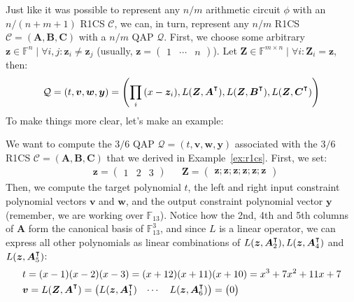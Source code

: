 \noindent Just like it was possible to represent any \(n/m\) arithmetic circuit \(\phi \) with an
\(n/(n+m+1)\) R1CS \(\mathcal{C}\), we can, in turn, represent any \(n/m\) R1CS
\(\mathcal{C} = (\bm{A}, \bm{B}, \bm{C})\) with a \(n/m\) QAP \(\mathcal{Q}\).
First, we choose some arbitrary
\(\bm{z} \in \mathbb{F}^n \mid \forall i,j\colon \bm{z}_i \neq \bm{z}_j\)
(usually, \(\bm{z} = \begin{pmatrix}1 & \cdots & n\end{pmatrix}\)).
Let \(\bm{Z} \in \mathbb{F}^{m \times n} \mid \forall i\colon \bm{Z}_i = \bm{z}\), then:
\[\mathcal{Q} = (t, \bm{v}, \bm{w}, \bm{y}) = \left(
	\prod_{i}{(x - \bm{z}_i)},
	L(\bm{Z}, \bm{A}^\transpose),
	L(\bm{Z}, \bm{B}^\transpose),
	L(\bm{Z}, \bm{C}^\transpose)
	\right)
\]
To make things more clear, let's make an example:
\begin{example}
	We want to compute the \(3/6\) QAP \(\mathcal{Q} = (t, \bm{v}, \bm{w}, \bm{y})\) associated with
	the \(3/6\) R1CS \(\mathcal{C} = (\bm{A}, \bm{B}, \bm{C})\) that we derived in
	Example~\ref{ex:r1cs}.
	First, we set:
	\begin{align*}
		 & \bm{z} = \begin{pmatrix}1 & 2 & 3\end{pmatrix} &  &
		\bm{Z} = \begin{pmatrix}\bm{z}; \bm{z}; \bm{z}; \bm{z}; \bm{z}; \bm{z}\end{pmatrix}
	\end{align*}
	Then, we compute the target polynomial \(t\), the left and right input constraint polynomial
	vectors \(\bm{v}\) and \(\bm{w}\), and the output constraint polynomial vector \(\bm{y}\)
	(remember, we are working over \(\mathbb{F}_{13}\)).
	Notice how the 2nd, 4th and 5th columns of \(\bm{A}\) form the canonical basis of
	\(\mathbb{F}_{13}^3\), and since \(L\) is a linear operator, we can express all other polynomials
	as linear combinations of \(L(\bm{z}, \bm{A}_2^\transpose), L(\bm{z}, \bm{A}_4^\transpose)\) and
	\(L(\bm{z}, \bm{A}_5^\transpose)\):
	\begin{align*}
		 & t	 = (x - 1)(x - 2)(x - 3) = (x + 12)(x + 11)(x + 10) = x^3 + 7x^2 + 11x + 7 \\
		 & \bm{v} = L(\bm{Z}, \bm{A}^{\transpose}) =
		\begin{pmatrix}
			L(\bm{z}, \bm{A}^{\transpose}_1) & \cdots & L(\bm{z}, \bm{A}^{\transpose}_6)
		\end{pmatrix}
		= {\begin{pmatrix}
			   0               \\

\end{pmatrix}}
\end{align*}
\end{example}

